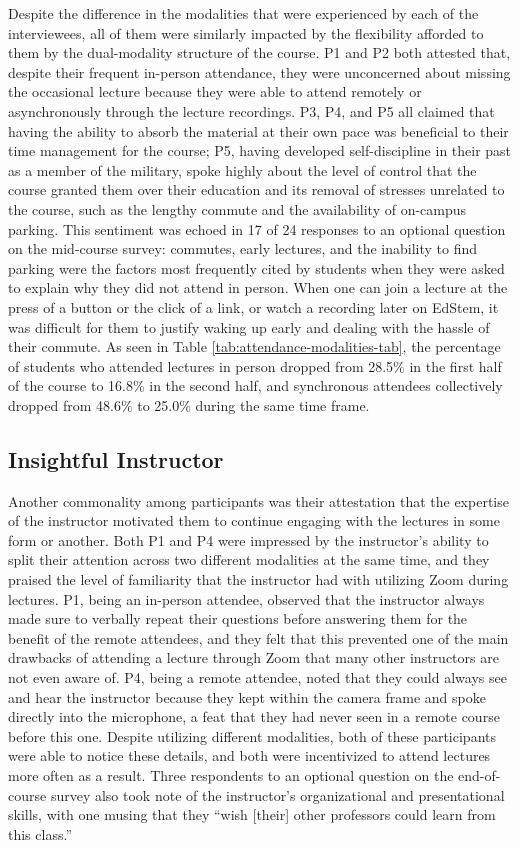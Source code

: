 Despite the difference in the modalities that were experienced by each of the interviewees, all of them were similarly impacted by the flexibility afforded to them by the dual-modality structure of the course. P1 and P2 both attested that, despite their frequent in-person attendance, they were unconcerned about missing the occasional lecture because they were able to attend remotely or asynchronously through the lecture recordings. P3, P4, and P5 all claimed that having the ability to absorb the material at their own pace was beneficial to their time management for the course; P5, having developed self-discipline in their past as a member of the military, spoke highly about the level of control that the course granted them over their education and its removal of stresses unrelated to the course, such as the lengthy commute and the availability of on-campus parking. This sentiment was echoed in 17 of 24 responses to an optional question on the mid-course survey: commutes, early lectures, and the inability to find parking were the factors most frequently cited by students when they were asked to explain why they did not attend in person. When one can join a lecture at the press of a button or the click of a link, or watch a recording later on EdStem, it was difficult for them to justify waking up early and dealing with the hassle of their commute. As seen in Table \ref{tab:attendance-modalities-tab}, the percentage of students who attended lectures in person dropped from 28.5\% in the first half of the course to 16.8\% in the second half, and synchronous attendees collectively dropped from 48.6\% to 25.0\% during the same time frame.

\subsection{Insightful Instructor}

Another commonality among participants was their attestation that the expertise of the instructor motivated them to continue engaging with the lectures in some form or another. Both P1 and P4 were impressed by the instructor’s ability to split their attention across two different modalities at the same time, and they praised the level of familiarity that the instructor had with utilizing Zoom during lectures. P1, being an in-person attendee, observed that the instructor always made sure to verbally repeat their questions before answering them for the benefit of the remote attendees, and they felt that this prevented one of the main drawbacks of attending a lecture through Zoom that many other instructors are not even aware of. P4, being a remote attendee, noted that they could always see and hear the instructor because they kept within the camera frame and spoke directly into the microphone, a feat that they had never seen in a remote course before this one. Despite utilizing different modalities, both of these participants were able to notice these details, and both were incentivized to attend lectures more often as a result. Three respondents to an optional question on the end-of-course survey also took note of the instructor’s organizational and presentational skills, with one musing that they “wish [their] other professors could learn from this class.”

\vspace{2cm}